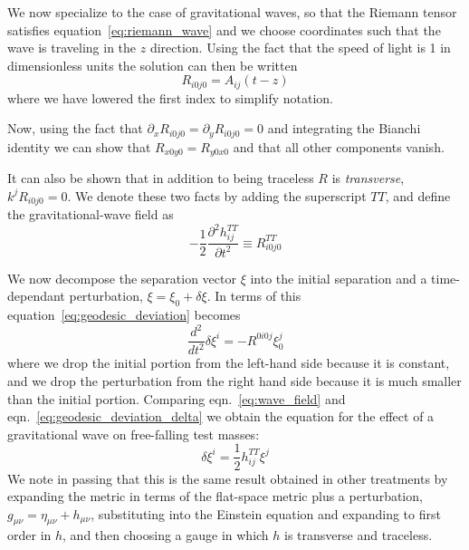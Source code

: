 We now specialize to the case of gravitational waves, so that the
Riemann tensor satisfies equation~\ref{eq:riemann_wave} and we choose
coordinates such that the wave is traveling in the $z$ direction.
Using the fact that the speed of light is 1 in dimensionless units the
solution can then be written
%
\begin{equation*}
R_{i 0 j 0} = A_{ij}(t - z)
\end{equation*}
%
where we have lowered the first index to simplify notation.

Now, using the fact that $\partial_x R_{i0j0} = \partial_y R_{i0j0}
= 0$ and integrating the Bianchi identity we can show that
$R_{x 0 y 0} = R_{y 0 x 0}$ and that all other components vanish.

It can also be shown that in addition to being traceless $R$ is
\emph{transverse}, $k^j R_{i0j0} = 0$.  We denote these two facts by
adding the superscript $TT$, and define the gravitational-wave field as
%
\begin{equation}
\label{eq:wave_field}
-\frac{1}{2} \frac{\partial^2 h_{ij}^{TT}}{\partial t^2}
\equiv R^{TT}_{i0j0}
\end{equation}

We now decompose the separation vector $\xi$ into the initial
separation and a time-dependant perturbation, $\xi = \xi_0 + \delta
\xi$.  In terms of this equation~\ref{eq:geodesic_deviation} becomes
%
\begin{equation}
\label{eq:geodesic_deviation_delta}
\frac{d^2}{dt^2} \delta \xi^i = -R^{0 i 0 j} \xi_0^j
\end{equation}
%
where we drop the initial portion from the left-hand side because it
is constant, and we drop the perturbation from the right hand side
because it is much smaller than the initial portion.  Comparing
eqn.~\ref{eq:wave_field} and eqn.~\ref{eq:geodesic_deviation_delta}
we obtain the equation for the effect of a gravitational wave on
free-falling test masses:
%
\begin{equation}
\label{eq:wave_effect}
\delta \xi^i = \frac{1}{2} h^{TT}_{ij} \xi^j
\end{equation}
%
We note in passing that this is the same result obtained in other
treatments by expanding the metric in terms of the flat-space metric
plus a perturbation, $g_{\mu\nu} = \eta_{\mu\nu} + h_{\mu\nu}$,
substituting into the Einstein equation and expanding to first order
in $h$, and then choosing a gauge in which $h$ is transverse and
traceless.

